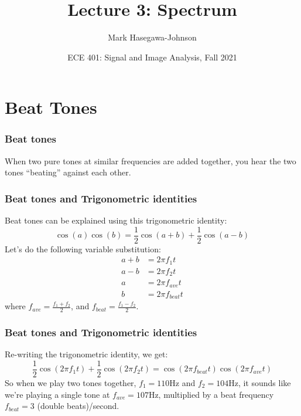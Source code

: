 \documentclass{beamer}
\title{Lecture 3: Spectrum}
\author{Mark Hasegawa-Johnson}
\date{ECE 401: Signal and Image Analysis, Fall 2021}
\begin{document}
\begin{frame}
  \maketitle
\end{frame}

\begin{frame}
  \tableofcontents
\end{frame}

\section[Beating]{Beat Tones}
\setcounter{subsection}{1}

\begin{frame}
  \frametitle{Beat tones}

  When two pure tones at similar frequencies are added together, you hear the  two tones
  ``beating'' against each other.
  \vspace*{1cm}
  \centerline{}
\end{frame}

\begin{frame}
  \frametitle{Beat tones and Trigonometric identities}

  Beat tones can be explained using this trigonometric identity:
  \[
  \cos(a)\cos(b)=\frac{1}{2}\cos(a+b)+\frac{1}{2}\cos(a-b)
  \]
  Let's do the following variable substitution:
  \begin{align*}
    a+b &= 2\pi f_1 t\\
    a-b &= 2\pi f_2 t\\
    a &= 2\pi f_{ave}t\\
    b &= 2\pi f_{beat}t
  \end{align*}
  where $f_{ave}=\frac{f_1+f_2}{2}$, and $f_{beat}=\frac{f_1-f_2}{2}$.
\end{frame}

\begin{frame}
  \frametitle{Beat tones and Trigonometric identities}

  Re-writing the trigonometric identity, we get:
  \[
  \frac{1}{2}\cos(2\pi f_1t)+\frac{1}{2}\cos(2\pi f_2 t) = \cos(2\pi f_{beat}t)\cos(2\pi f_{ave}t)
  \]
  So when we play two tones together, $f_1=110$Hz and $f_2=104$Hz, it
  sounds like we're playing a single tone at $f_{ave}=107$Hz,
  multiplied by a beat frequency $f_{beat}=3$ (double beats)/second.
\end{frame}
\end{document}
